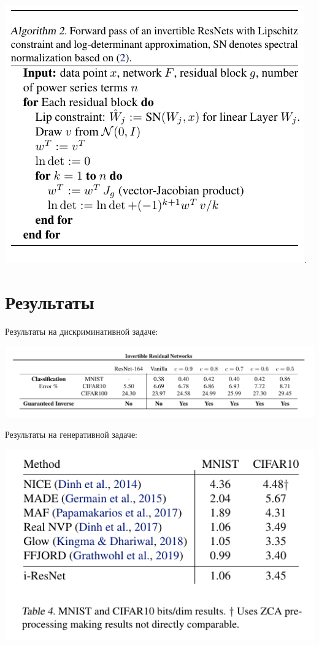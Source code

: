 \documentclass{article}
\begin{document}
\includegraphics[scale=0.6]{algo_resnet.png}.

\section{Результаты}

Результаты на дискриминативной задаче: 

\includegraphics[scale=0.6]{disc_res.png}


Результаты на генеративной задаче:

\includegraphics[scale=0.6]{gen_table.png}
\end{document}

